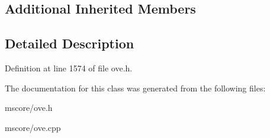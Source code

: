 \subsection*{Additional Inherited Members}


\subsection{Detailed Description}


Definition at line 1574 of file ove.\+h.



The documentation for this class was generated from the following files\+:\begin{DoxyCompactItemize}
\item 
mscore/ove.\+h\item 
mscore/ove.\+cpp\end{DoxyCompactItemize}

